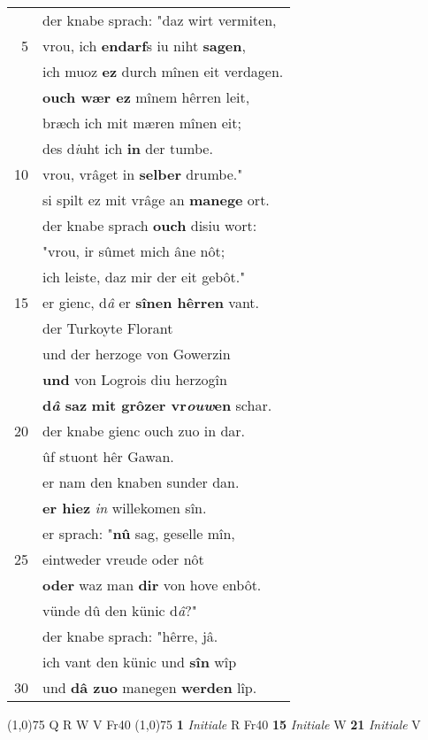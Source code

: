 \documentclass[8pt,a4paper,notitlepage]{article}
\begin{document}
\begin{table}[ht]
\begin{minipage}[t]{0.5\linewidth}
\begin{tabular}{rl}
 & der knabe sprach: "daz wirt vermiten,\\ 
5 & vrou, ich \textbf{en}\textbf{darf}s iu niht \textbf{sagen},\\ 
 & ich muoz \textbf{ez} durch mînen eit verdagen.\\ 
 & \textbf{ouch wær ez} mînem hêrren leit,\\ 
 & bræch ich mit mæren mînen eit;\\ 
 & des d\textit{i}uht ich \textbf{in} der tumbe.\\ 
10 & vrou, vrâget in \textbf{selber} drumbe."\\ 
 & si spilt ez mit vrâge an \textbf{manege} ort.\\ 
 & der knabe sprach \textbf{ouch} disiu wort:\\ 
 & "vrou, ir sûmet mich âne nôt;\\ 
 & ich leiste, daz mir der eit gebôt."\\ 
15 & er gienc, d\textit{â} er \textbf{sînen hêrren} vant.\\ 
 & der Turkoyte Florant\\ 
 & und der herzoge von Gowerzin\\ 
 & \textbf{und} von Logrois diu herzogîn\\ 
 & \textbf{d\textit{â} saz} \textbf{mit grôzer vr\textit{ouw}en} schar.\\ 
20 & der knabe gienc ouch zuo in dar.\\ 
 & ûf stuont hêr Gawan.\\ 
 & er nam den knaben sunder dan.\\ 
 & \textbf{er hiez} \textit{in} willekomen sîn.\\ 
 & er sprach: "\textbf{nû} sag, geselle mîn,\\ 
25 & eintweder vreude oder nôt\\ 
 & \textbf{oder} waz man \textbf{dir} von hove enbôt.\\ 
 & vünde dû den künic d\textit{â}?"\\ 
 & der knabe sprach: "hêrre, jâ.\\ 
 & ich vant den künic und \textbf{sîn} wîp\\ 
30 & und \textbf{dâ zuo} manegen \textbf{werden} lîp.\\ 
\end{tabular}
\scriptsize
\line(1,0){75} \newline
Q R W V Fr40 \newline
\line(1,0){75} \newline
\textbf{1} \textit{Initiale} R Fr40  \textbf{15} \textit{Initiale} W  \textbf{21} \textit{Initiale} V  \newline

\end{minipage}
\end{table}
\end{document}
